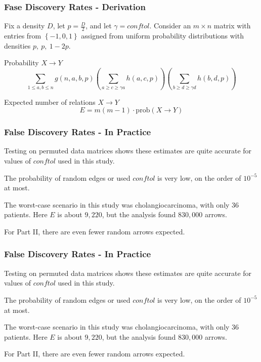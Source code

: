 \documentclass[
	11pt, %
]{beamer}
\begin{document}
\begin{frame}
    \frametitle{Fase Discovery Rates - Derivation}

    Fix a density $D$, let $p=\frac{D}{2}$, and let $\gamma = conftol$. Consider an $m \times n$ matrix with entries from $\left\{ -1, 0, 1 \right\}$ assigned from uniform probability distributions with densities $p,\ p,\ 1-2p$.
    
    \smallskip

    \begin{block}{Probability $X \rightarrow Y$}
        \begin{equation*}
            \sum_{1\leq a,b\leq n}g(n,a,b,p)\left( \sum_{a\geq c \geq \gamma a} h(a,c,p) \right)\left( \sum_{b\geq d \geq \gamma d} h(b,d,p) \right)
        \end{equation*}        
    \end{block}

    \begin{block}{Expected number of relations $X \rightarrow Y$}
        \begin{equation*}
            E = m(m-1) \cdot \mathrm{prob}(X \rightarrow Y)
        \end{equation*}        
    \end{block}
\end{frame}

\begin{frame}
    \frametitle{False Discovery Rates - In Practice}

    Testing on permuted data matrices shows these estimates are quite accurate for values of $conftol$ used in this study.

    \bigskip

    The probability of random edges or used $conftol$ is very low, on the order of $10^{-5}$ at most.

    \bigskip

    The worst-case scenario in this study was cholangiocarcinoma, with only 36 patients. Here $E$ is about $9,220$, but the analysis found $830,000$ arrows.

    \bigskip

    For Part II, there are even fewer random arrows expected.
\end{frame}

\begin{frame}
    \frametitle{False Discovery Rates - In Practice}

    Testing on permuted data matrices shows these estimates are quite accurate for values of $conftol$ used in this study.

    \bigskip

    The probability of random edges or used $conftol$ is very low, on the order of $10^{-5}$ at most.

    \bigskip

    The worst-case scenario in this study was cholangiocarcinoma, with only 36 patients. Here $E$ is about $9,220$, but the analysis found $830,000$ arrows.

    \bigskip

    For Part II, there are even fewer random arrows expected.
\end{frame}
\end{document}
